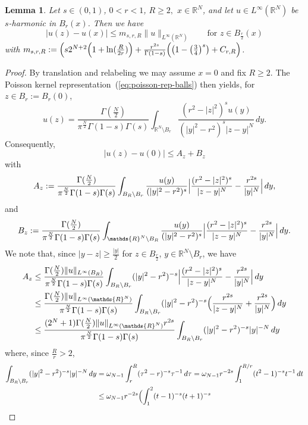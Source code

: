 \documentclass[notitlepage,11pt,reqno]{amsart}
\newtheorem{lemma}[theorem]{Lemma}
\theoremstyle{definition}
\numberwithin{equation}{section}
\newcommand{\RR}{\mathds{R}}
\begin{document}
\begin{lemma}\label{lem-thm1.0}
 Let $s\in(0,1)$, $0<r<1$, $R\geq 2,$ $x \in \RR^N$, and let $u \in L^\infty(\RR^N)$ be $s$-harmonic in $B_r(x)$. Then we have 
$$
|u(z)-u(x)| \le   m_{s,r,R} \|u\|_{L^\infty(\RR^N)} \qquad \text{for $z  \in B_{\frac{r}{2}}(x)$}
$$
with $m_{s,r,R}:= \Bigl(s2^{N+2}\Bigl(1+\ln(\frac{R}{2r})\Bigr) +\frac{ r^{2s}}{\Gamma(1-s)}\Bigl( \bigl(1-  \bigl(\frac{3}{4}\bigr)^s\bigr)   + C_{r,R}\Bigr)$.
\end{lemma}

\begin{proof}
By translation and relabeling we may assume $x = 0$ and fix $R \ge 2$. The Poisson kernel representation~(\ref{eq:poisson-rep-balls}) then yields, for $z\in B_r:=B_r(0)$,
$$
u(z)=\frac{\Gamma(\frac{N}{2})}{\pi^{\frac{N}{2}}\Gamma(1-s)\Gamma(s)}\int_{\RR^N\setminus B_r}\frac{(r^2-|z|^2)^su(y)}{(|y|^2-r^2)^s|z-y|^N}\, dy.
$$
Consequently, 
$$
|u(z)-u(0)| \le A_z + B_z
$$
with 
$$
A_z:= \frac{\Gamma(\frac{N}{2})}{\pi^{\frac{N}{2}}\Gamma(1-s)\Gamma(s)}
\int_{B_R\setminus B_r} \frac{u(y)}{(|y|^2-r^2)^s} \Bigl| \frac{(r^2-|z|^2)^s}{|z-y|^N}-\frac{r^{2s}}{|y|^N}\Bigr|\, dy,
$$
and 
$$
B_z:= \frac{\Gamma(\frac{N}{2})}{\pi^{\frac{N}{2}}\Gamma(1-s)\Gamma(s)}
\int_{\RR^N\setminus B_R} \frac{u(y)}{(|y|^2-r^2)^s} \Bigl| \frac{(r^2-|z|^2)^s}{|z-y|^N}-\frac{r^{2s}}{|y|^N}\Bigr|\, dy. 
$$
We note that, since $|y-z| \ge \frac{|y|}{2}$ for $z \in B_{\frac{r}{2}}$, $y \in \RR^N \setminus B_r$, we have  
\begin{align*}
A_z &\le \frac{\Gamma(\frac{N}{2})\|u\|_{L^\infty(B_R)}}{\pi^{\frac{N}{2}}\Gamma(1-s)\Gamma(s)} \int_{B_R \setminus B_r}  (|y|^2-r^2)^{-s}  \Bigl| \frac{(r^2-|z|^2)^s}{|z-y|^N}-\frac{r^{2s}}{|y|^N}\Bigr|\, dy\\
&\le \frac{\Gamma(\frac{N}{2})\|u\|_{L^\infty(\RR^N)}}{\pi^{\frac{N}{2}}\Gamma(1-s)\Gamma(s)} \int_{B_R \setminus B_r} (|y|^2-r^2)^{-s}  \Bigl( \frac{r^{2s}}{|z-y|^N} +\frac{r^{2s}}{|y|^N}\Bigr)\, dy\\
&\le \frac{(2^N+1) \Gamma(\frac{N}{2})\|u\|_{L^\infty(\RR^N)}r^{2s}}{\pi^{\frac{N}{2}}\Gamma(1-s)\Gamma(s)} \int_{B_R \setminus B_r} (|y|^2-r^2)^{-s}  |y|^{-N}\, dy
\end{align*}
where, since $\frac{R}{r}>2$,
\begin{align*}
 \int_{B_R \setminus B_r} (|y|^2-r^2)^{-s}|y|^{-N}\, dy&=\omega_{N-1}\int_r^R(\tau^2-r)^{-s}\tau^{-1}\, d\tau=\omega_{N-1}r^{-2s}\int_{1}^{R/r}(t^2-1)^{-s}
t^{-1}\, dt\\
&\leq \omega_{N-1}r^{-2s}\Bigl(\int_{1}^{2}(t-1)^{-s}(t+1)^{-s}

\end{align*}
\end{proof}
\end{document}
